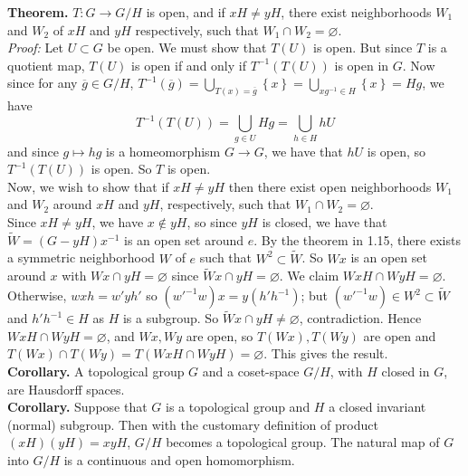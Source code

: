 \documentclass[a4paper]{article}
\theoremstyle{plain}%
\theoremstyle{definition}
\theoremstyle{remark}
\begin{document}
    \textbf{Theorem.} $T  \colon G \to  G /H$ is open, and if 
    $xH \neq yH$, there exist neighborhoods $W_1$ and $W_2$ of $xH$ and
    $yH$ respectively, such that $W_1 \cap W_2 = \varnothing$.\\
    \linebreak
    \textit{Proof:} 
    Let $U \subset G$ be open. We must show that
    $T(U)$ is open. But since $T$ is a quotient map, $T(U)$ is open if and only
    if $T^{-1} \left( T(U) \right) $ is open in $G$. Now
    since for any $\overline{g} \in G /H$,
    $T^{-1}(\overline{g})
    = \bigcup_{T(x) = \overline{g}} \left\{ x \right\} 
    = \bigcup_{x g^{-1} \in H} \left\{ x \right\} 
    = Hg$, we have
    \[
    T^{-1} \left( T(U) \right) 
    = \bigcup_{g \in U}  Hg
    = \bigcup_{h \in H} hU
    \] 
    and since $g \mapsto hg$ is a homeomorphism $G \to G$, we have that
    $hU$ is open, so $T^{-1} \left( T(U) \right) $ is open. So
    $T$ is open.\\
    \linebreak
    Now, we wish to show that if $xH \neq yH$ then there
    exist open neighborhoods $W_1$ and $W_2$ around $xH$ and $yH$,
    respectively, such that $W_1 \cap W_2 = \varnothing$.\\
    Since $xH \neq yH$, we have $x \not\in yH$, so since
    $yH$ is closed, we have that $\tilde{W}=(G - yH)x^{-1}$ is an open set around $e$.
    By the theorem in 1.15, there exists a symmetric neighborhood $W$ of $e$ 
    such that $W^2 \subset \tilde{W}$.
    So $Wx$ is an open set around $x$ with $Wx \cap yH = \varnothing$ since
    $\tilde{W}x \cap yH = \varnothing$. We claim
    $WxH \cap WyH = \varnothing$. Otherwise, $wxh = w'yh'$ so
    $(w'^{-1}w) x =y (h'h^{-1})$; but $\left( w'^{-1} w \right) \in W^2
    \subset \tilde{W}$ and $h'h^{-1} \in H$ as $H$ is a subgroup. So
    $\tilde{W} x \cap yH \neq \varnothing$, contradiction.
    Hence $WxH \cap WyH = \varnothing$, and $Wx,Wy$ are open, so
    $T(Wx),T(Wy)$ are open and
    $T(Wx) \cap T(Wy) = T\left( WxH \cap WyH \right) = \varnothing$. This gives
    the result.\\
    \linebreak
    \textbf{Corollary.} A topological group $G$ and a coset-space
    $G /H$, with  $H$ closed in $G$, are Hausdorff spaces.\\
    \linebreak
    \textbf{Corollary.} Suppose that $G$ is a topological group and
    $H$ a closed invariant (normal) subgroup. Then with the customary definition of
    product $\left( xH \right) \left( yH \right) = xyH$, $G /H$ becomes
    a topological group. The natural map of $G$ into $G /H$ is a continuous and
    open homomorphism.
    



    
\end{document}
